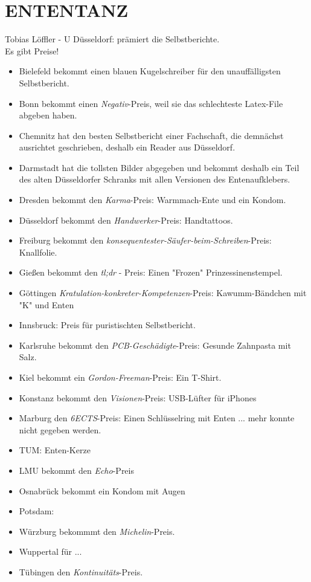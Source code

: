 \section{ENTENTANZ}
  Tobias Löffler - U Düsseldorf:  prämiert die Selbstberichte. \\
  Es gibt Preise!
  \begin{itemize}
    \item Bielefeld bekommt einen blauen Kugelschreiber für den unauffälligsten Selbstbericht.
    \item Bonn bekommt einen \textit{Negativ}-Preis, weil sie das schlechteste Latex-File abgeben haben.
    \item Chemnitz hat den besten Selbstbericht einer Fachschaft, die demnächst ausrichtet geschrieben, deshalb ein Reader aus Düsseldorf.
    \item Darmstadt hat die tollsten Bilder abgegeben und bekommt deshalb ein Teil des alten Düsseldorfer Schranks mit allen Versionen des Entenaufklebers.
    \item Dresden bekommt den \textit{Karma}-Preis: Warmmach-Ente und ein Kondom.
    \item Düsseldorf bekommt den \textit{Handwerker}-Preis: Handtattoos.
    \item Freiburg bekommt den \textit{konsequentester-Säufer-beim-Schreiben}-Preis: Knallfolie.
    \item Gießen bekommt den \textit{tl;dr} - Preis: Einen "Frozen" Prinzessinenstempel.
    \item Göttingen \textit{Kratulation-konkreter-Kompetenzen}-Preis: Kawumm-Bänd\-chen mit "K" und Enten
    \item Innsbruck: Preis für puristischten Selbstbericht.
    \item Karlsruhe bekommt den \textit{PCB-Geschädigte}-Preis: Gesunde Zahnpasta mit Salz.
    \item Kiel bekommt ein \textit{Gordon-Freeman}-Preis: Ein T-Shirt.
    \item Konstanz bekommt den \textit{Visionen}-Preis: USB-Lüfter für iPhones
    \item Marburg den \textit{6ECTS}-Preis: Einen Schlüsselring mit Enten ... mehr konnte nicht gegeben werden.
    \item TUM: Enten-Kerze
    \item LMU bekommt den \textit{Echo}-Preis
    \item Osnabrück bekommt ein Kondom mit Augen
    \item Potsdam:
    \item Würzburg bekommmt den \textit{Michelin}-Preis.
    \item Wuppertal für ...
    \item Tübingen den \textit{Kontinuitäts}-Preis.
  \end{itemize}

